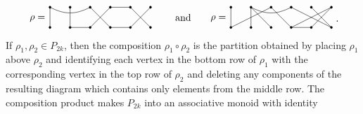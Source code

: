 \documentclass[11pt,a4paper,reqno,svgnames]{amsart}
\theoremstyle{plain}
\theoremstyle{definition}
\numberwithin{equation}{section}
\begin{document}
\begin{align*}
\begin{matrix}
\begin{tikzpicture}[scale=0.9]
\node at (-7.1,-0.45) {$\displaystyle \rho= \color{black}$};
\filldraw [black] (-6.6,0) circle (1.2pt);
\filldraw [black] (-6.6,-0.8) circle (1.2pt);
\filldraw [black] (-5.8,0) circle (1.2pt);
\filldraw [black] (-5.8,-0.8) circle (1.2pt);
\filldraw [black] (-5.0,0) circle (1.2pt);
\filldraw [black] (-5.0,-0.8) circle (1.2pt);
\filldraw [black] (-4.2,0) circle (1.2pt);
\filldraw [black] (-4.2,-0.8) circle (1.2pt);
\filldraw [black] (-3.4,0) circle (1.2pt);
\filldraw [black] (-3.4,-0.8) circle (1.2pt);
\filldraw [black] (-2.6,-0.0) circle (1.2pt);
\filldraw [black] (-2.6,-0.8) circle (1.2pt);
\draw (-6.6,0) -- (-6.6,-0.8);
\draw (-5.8,0) -- (-5.8,-0.8);
\draw (-5.8,-0.8) -- (-5.0,-0.8);
\draw (-6.6,0) .. controls (-6.0,-0.3) and (-5.6,-0.3) .. (-5.0,0.0);
\draw (-5.0,-0.0) -- (-4.2,-0.8);
\draw (-5.0,-0.8) -- (-4.2,-0.0);
\draw (-3.4,-0.0) -- (-4.2,-0.0);
\draw (-3.4,-0.8) -- (-4.2,-0.8);
\draw (-2.6,-0.8) -- (-3.4,-0.0);
\draw (-2.6,-0.0) -- (-3.4,-0.8);
\node at (-1.3,-0.40) {$\displaystyle \text{and} \color{black}$};
\node at (0.1,-0.45) {$\displaystyle \rho= \color{black}$};
\filldraw [black] (0.6,0) circle (1.2pt);
\filldraw [black] (0.6,-0.8) circle (1.2pt);
\filldraw [black] (1.4,0) circle (1.2pt);
\filldraw [black] (1.4,-0.8) circle (1.2pt);
\filldraw [black] (2.2,0) circle (1.2pt);
\filldraw [black] (2.2,-0.8) circle (1.2pt);
\filldraw [black] (3.0,0.0) circle (1.2pt);
\filldraw [black] (3.0,-0.8) circle (1.2pt);
\filldraw [black] (3.8,0.0) circle (1.2pt);
\filldraw [black] (3.8,-0.8) circle (1.2pt);
\filldraw [black] (4.6,0) circle (1.2pt);
\filldraw [black] (4.6,-0.8) circle (1.2pt);
\draw (0.6,0) -- (0.6,-0.8);
\draw (0.6,-0.8) -- (2.2,-0.0);
\draw (1.4,0) -- (1.4,-0.8);
\draw (1.4,0) -- (2.2,-0.8);
\draw (1.4,0) .. controls (2.0,-0.3) and (2.4,-0.3) .. (3.0,-0.0);
\draw (2.2,-0.0) -- (3.0,-0.8);
\draw (3.0,-0.8) -- (3.8,-0.8);
\draw (3.0,-0.8) -- (4.6,-0.0);
\draw (3.8,-0.8) -- (4.6,-0.0);
\draw (3.0,-0.0) -- (4.6,-0.8);
\draw (3.8,-0.0) -- (4.6,-0.8);
\end{tikzpicture}
\end{matrix}\ .
\end{align*}
If $\rho_1,\rho_2\in{P}_{2k}$, then the composition $\rho_1\circ\rho_2$ is the partition obtained by placing $\rho_1$ above $\rho_2$ and identifying each vertex in the bottom row of $\rho_1$ with the corresponding vertex in the top row of $\rho_2$ and deleting any components of the resulting diagram which contains only elements from the middle row. The composition product makes $P_{2k}$ into an associative monoid with identity
\end{document}

